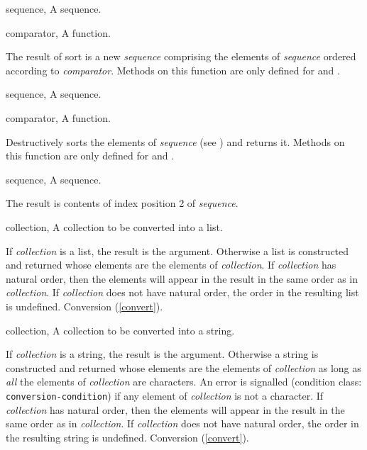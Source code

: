 \begin{optDefinition}
%
\begin{genericargs}
    \item[sequence, \classref{sequence}] A sequence.
    \item[comparator, \classref{function}] A function.
\end{genericargs}
%
\result%
The result of sort is a new {\em sequence} comprising the elements of {\em
    sequence\/} ordered according to {\em comparator}.
%
\remarks%
Methods on this function are only defined for  and
.

%
\begin{genericargs}
    \item[sequence, \classref{sequence}] A sequence.
    \item[comparator, \classref{function}] A function.
\end{genericargs}
%
\result%
Destructively sorts the elements of {\em sequence} (see ) and
returns it.
%
\remarks%
Methods on this function are only defined for  and
.

%
\begin{genericargs}
    \item[sequence, \classref{sequence}] A sequence.
\end{genericargs}
%
\result%
The result is contents of index position 2 of {\em sequence}.

%
\begin{specargs}
    \item[collection, \classref{collection}] A collection to be converted into a
    list.
\end{specargs}
%
\result%
If {\em collection\/} is a list, the result is the argument.  Otherwise
a list is constructed and returned whose elements are the elements of {\em
    collection}.  If {\em collection\/} has natural order, then the elements
will appear in the result in the same order as in {\em collection}.  If {\em
    collection\/} does not have natural order, the order in the resulting list
is undefined.
%
\seealso%
Conversion (\ref{convert}).

%
\begin{specargs}
    \item[collection, \classref{collection}] A collection to be converted into a
    string.
\end{specargs}
%
\result%
If {\em collection\/} is a string, the result is the argument.
Otherwise a string is constructed and returned whose elements are the elements
of {\em collection\/} as long as {\em all\/} the elements of {\em collection\/}
are characters.  An error is signalled (condition class: {\tt
    conversion-condition}) if any element
of {\em collection\/} is not a character.  If {\em collection\/} has natural
order, then the elements will appear in the result in the same order as in {\em
    collection}.  If {\em collection\/} does not have natural order, the order
in the resulting string is undefined.
%
\seealso%
Conversion (\ref{convert}).


\end{optDefinition}
